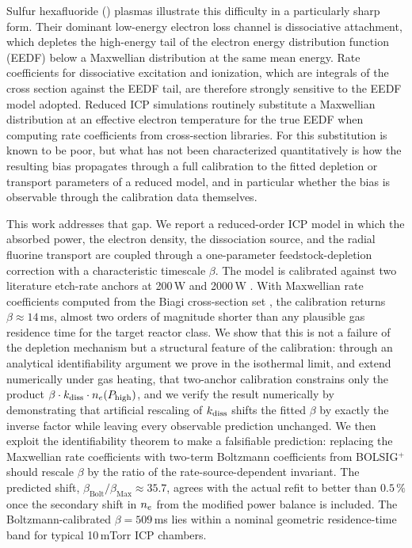 Sulfur hexafluoride (\sfsix{}) plasmas illustrate this difficulty in
a particularly sharp form. Their dominant low-energy electron loss
channel is dissociative attachment, which depletes the high-energy
tail of the electron energy distribution function (EEDF) below a
Maxwellian distribution at the same mean energy. Rate coefficients
for dissociative excitation and ionization, which are integrals of
the cross section against the EEDF tail, are therefore strongly
sensitive to the EEDF model adopted. Reduced ICP simulations
routinely substitute a Maxwellian distribution at an effective
electron temperature for the true EEDF when computing rate
coefficients from cross-section libraries. For \sfsix{} this
substitution is known to be poor, but what has not been
characterized quantitatively is how the resulting bias propagates
through a full calibration to the fitted depletion or transport
parameters of a reduced model, and in particular whether the bias is
observable through the calibration data themselves.

This work addresses that gap. We report a reduced-order \sfsix{} ICP
model in which the absorbed power, the electron density, the
dissociation source, and the radial fluorine transport are coupled
through a one-parameter feedstock-depletion correction with a
characteristic timescale $\beta$. The model is calibrated against
two literature etch-rate anchors at 200\,W and 2000\,W
\citep{mansano1999,panduranga2019}. With Maxwellian rate
coefficients computed from the Biagi \sfsix{} cross-section set
\citep{biagi}, the calibration returns $\beta \approx 14$\,ms,
almost two orders of magnitude shorter than any plausible gas
residence time for the target reactor class. We show that this is
not a failure of the depletion mechanism but a structural feature
of the calibration: through an analytical identifiability argument
we prove in the isothermal limit, and extend numerically under gas
heating, that two-anchor calibration constrains only the product
$\beta \cdot k_{\mathrm{diss}} \cdot n_e(P_{\mathrm{high}})$, and we verify
the result numerically by demonstrating that artificial rescaling
of $k_{\mathrm{diss}}$ shifts the fitted $\beta$ by exactly the inverse factor
while leaving every observable prediction unchanged. We then
exploit the identifiability theorem to make a falsifiable
prediction: replacing the Maxwellian rate coefficients with two-term
Boltzmann coefficients from BOLSIG$^+$ \citep{hagelaar2005} should
rescale $\beta$ by the ratio of the rate-source-dependent invariant.
The predicted shift,
$\beta_{\mathrm{Bolt}}/\beta_{\mathrm{Max}} \approx 35.7$, agrees
with the actual refit to better than $0.5\,\%$ once the secondary
shift in $n_e$ from the modified power balance is included. The
Boltzmann-calibrated $\beta = 509$\,ms lies within a nominal
geometric residence-time band for typical 10\,mTorr ICP chambers.

